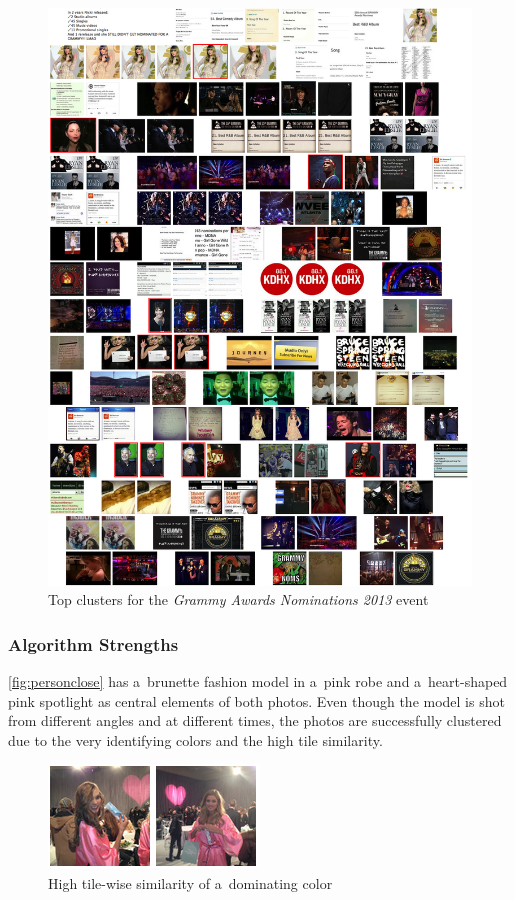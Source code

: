 \begin{figure}[h!]
  \centering
  \includegraphics[width=1.0\linewidth]{./grammy_clusters.png}
  \caption{Top clusters for the \emph{Grammy Awards Nominations 2013} event}
  \label{fig:topgrammy}
\end{figure}

\subsubsection{Algorithm Strengths} 

\autoref{fig:personclose} has a~brunette fashion model in a~pink robe
and a~heart-shaped pink spotlight as central elements of both photos. 
Even though the model is shot from different angles and at different times,
the photos are successfully clustered due to the very identifying colors
and the high tile similarity. 

\begin{figure}[h!]
  \centering
  \includegraphics[width=0.4\linewidth]{./person.png}
  \caption{High tile-wise similarity of a~dominating color}
  \label{fig:personclose}
\end{figure}

